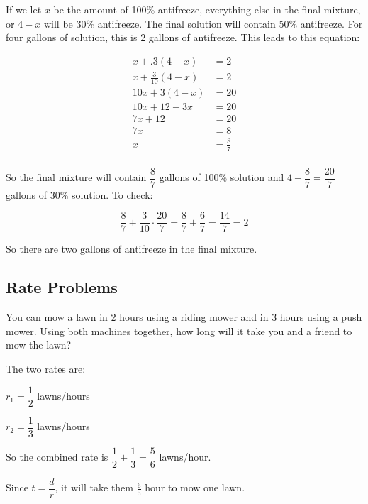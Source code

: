 \documentclass[fleqn,addpoints]{exam}
\begin{document}
\begin{questions}
\begin{solution}
If we let $x$ be the amount of 100\% antifreeze, everything else in the final mixture, or $4-x$ will be 30\%
antifreeze.  The final solution will contain 50\% antifreeze.  For four gallons of solution, this is 2 gallons of
antifreeze.  This leads to this equation:

\begin{align*}
  x + .3(4-x) &= 2 \\
  x + \frac{3}{10}(4-x) &= 2 \\
  10x + 3(4-x) &= 20 \\
  10x + 12 - 3x &= 20 \\
  7x + 12 &= 20 \\
  7x  &= 8 \\
  x  &= \frac{8}{7} \\
\end{align*}

So the final mixture will contain $\dfrac{8}{7}$ gallons of 100\% solution and $4 - \dfrac{8}{7} = \dfrac{20}{7}$
gallons of 30\% solution.  To check:

\[
  \frac{8}{7} + \frac{3}{10} \cdot \frac{20}{7} = \frac{8}{7} + \frac{6}{7} = \dfrac{14}{7} = 2
\]

So there are two gallons of antifreeze in the final mixture.

\end{solution}


\subsection{Rate Problems}
\question
You can mow a lawn in 2 hours using a riding mower and in 3 hours using a push mower.  Using both machines together, how
long will it take you and a friend to mow the lawn?

\begin{solution}
The two rates are:
\begin{itemize*}
  \item $r_1 = \dfrac{1}{2}$ lawns/hours
  \item $r_2 = \dfrac{1}{3}$ lawns/hours
\end{itemize*}

So the combined rate is $\dfrac{1}{2} + \dfrac{1}{3} = \dfrac{5}{6}$ lawns/hour.

Since $t = \dfrac{d}{r}$, it will take them $\frac{6}{5}$ hour to mow one lawn.

\end{solution}


\end{questions}
\end{document}
